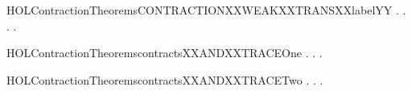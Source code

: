 \begin{SaveVerbatim}{HOLContractionTheoremsCONTRACTIONXXWEAKXXTRANSXXlabelYY}
\HOLTokenTurnstile{} \HOLSymConst{\HOLTokenForall{}}.
         \HOLSymConst{\HOLTokenImp{}}
       \HOLSymConst{\HOLTokenForall{}} .
              \HOLSymConst{\HOLTokenImp{}}
           \HOLSymConst{\HOLTokenForall{}} .
                \HOLTokenWeakTransBegin{} \HOLTokenWeakTransEnd {} \HOLSymConst{\HOLTokenImp{}}
               \HOLSymConst{\HOLTokenExists{}}.  \HOLTokenWeakTransBegin{} \HOLTokenWeakTransEnd {} \HOLSymConst{\HOLTokenConj{}}   
\end{SaveVerbatim}
\newcommand{\HOLContractionTheoremsCONTRACTIONXXWEAKXXTRANSXXlabelYY}{\UseVerbatim{HOLContractionTheoremsCONTRACTIONXXWEAKXXTRANSXXlabelYY}}
\begin{SaveVerbatim}{HOLContractionTheoremscontractsXXANDXXTRACEOne}
\HOLTokenTurnstile{} \HOLSymConst{\HOLTokenForall{}} .
          \HOLSymConst{\HOLTokenImp{}}
       \HOLSymConst{\HOLTokenForall{}} .
               \HOLSymConst{\HOLTokenImp{}}
           \HOLSymConst{\HOLTokenExists{}} .     \HOLSymConst{\HOLTokenConj{}}   
\end{SaveVerbatim}
\newcommand{\HOLContractionTheoremscontractsXXANDXXTRACEOne}{\UseVerbatim{HOLContractionTheoremscontractsXXANDXXTRACEOne}}
\begin{SaveVerbatim}{HOLContractionTheoremscontractsXXANDXXTRACETwo}
\HOLTokenTurnstile{} \HOLSymConst{\HOLTokenForall{}} .
          \HOLSymConst{\HOLTokenImp{}}
       \HOLSymConst{\HOLTokenForall{}} .
               \HOLSymConst{\HOLTokenImp{}}
           \HOLSymConst{\HOLTokenExists{}} .
                   \HOLSymConst{\HOLTokenConj{}}    \HOLSymConst{\HOLTokenConj{}}
                 \HOLSymConst{\HOLTokenLeq{}}  
\end{SaveVerbatim}
